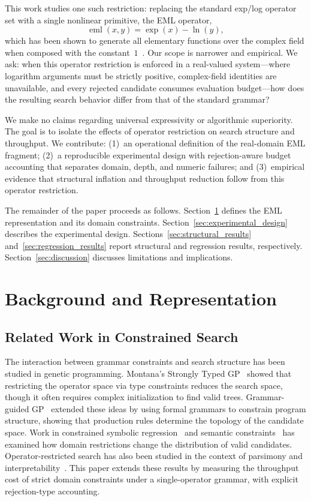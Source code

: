 \documentclass[runningheads]{llncs}
\newcommand{\eml}{\operatorname{eml}}
\newcommand{\expf}{\operatorname{exp}}
\newcommand{\lnf}{\operatorname{ln}}
\begin{document}
This work studies one such restriction: replacing the standard exp/log operator
set with a single nonlinear primitive, the EML operator,
\begin{equation}\label{eq:eml}
  \eml(x, y) = \expf(x) - \lnf(y),
\end{equation}
which has been shown to generate all elementary functions over the complex
field when composed with the constant~$1$~\cite{odrzywolek2026eml}. Our scope
is narrower and empirical. We ask: when this operator restriction is enforced
in a real-valued system---where logarithm arguments must be strictly positive,
complex-field identities are unavailable, and every rejected candidate consumes
evaluation budget---how does the resulting search behavior differ from that of
the standard grammar?

We make no claims regarding universal expressivity or algorithmic superiority. The goal is to isolate the effects of operator restriction on search structure and throughput. We contribute: (1)~an operational definition of the real-domain EML fragment; (2)~a reproducible experimental design with rejection-aware budget accounting that separates domain, depth, and numeric failures; and (3)~empirical evidence that structural inflation and throughput reduction follow from this operator restriction.

The remainder of the paper proceeds as follows. Section~\ref{sec:background} defines the EML
representation and its domain constraints. Section~\ref{sec:experimental_design} describes the experimental
design. Sections~\ref{sec:structural_results} and~\ref{sec:regression_results} report structural and regression results, respectively.
Section~\ref{sec:discussion} discusses limitations and implications.

\section{Background and Representation}\label{sec:background}

\subsection{Related Work in Constrained Search}
The interaction between grammar constraints and search structure has been studied in genetic programming. Montana's Strongly Typed GP~\cite{montana1995stgp} showed that restricting the operator space via type constraints reduces the search space, though it often requires complex initialization to find valid trees. Grammar-guided GP~\cite{mckay2010gggp,whigham1995gggp} extended these ideas by using formal grammars to constrain program structure, showing that production rules determine the topology of the candidate space. Work in constrained symbolic regression~\cite{lu2016constrained} and semantic constraints~\cite{trujillo2016semantic} has examined how domain restrictions change the distribution of valid candidates. Operator-restricted search has also been studied in the context of parsimony and interpretability~\cite{virgolin2021learning}. This paper extends these results by measuring the throughput cost of strict domain constraints under a single-operator grammar, with explicit rejection-type accounting.
\end{document}
